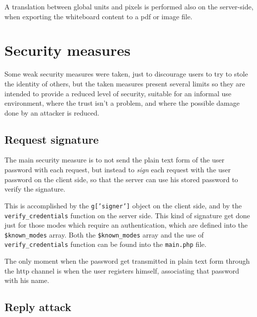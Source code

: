 \documentclass[10pt,a4paper,english]{book}
\begin{document}
A translation between global units and pixels is performed also on the
server-side, when exporting the whiteboard content to a pdf or image
file.



\hypertarget{security-measures}{}
\section{Security measures}
\label{security-measures}

Some weak security measures were taken, just to discourage users to
try to stole the identity of others, but the taken measures present
several limits so they are intended to provide a reduced level of
security, suitable for an informal use environment, where the trust
isn't a problem, and where the possible damage done by an attacker is
reduced.



\hypertarget{request-signature}{}
\subsection{Request signature}
\label{request-signature}

The main security measure is to not send the plain text form of the
user password with each request, but instead to \emph{sign} each request
with the user password on the client side, so that the server can use
his stored password to verify the signature.

This is accomplished by the \texttt{g{[}'signer'{]}} object on the client side,
and by the \texttt{verify{\_}credentials} function on the server side. This
kind of signature get done just for those modes which require an
authentication, which are defined into the \texttt{{\$}known{\_}modes}
array. Both the \texttt{{\$}known{\_}modes} array and the use of
\texttt{verify{\_}credentials} function can be found into the \texttt{main.php}
file.

The only moment when the password get transmitted in plain text form
through the http channel is when the user registers himself,
associating that password with his name.



\hypertarget{reply-attack}{}
\subsection{Reply attack}
\label{reply-attack}
\end{document}
